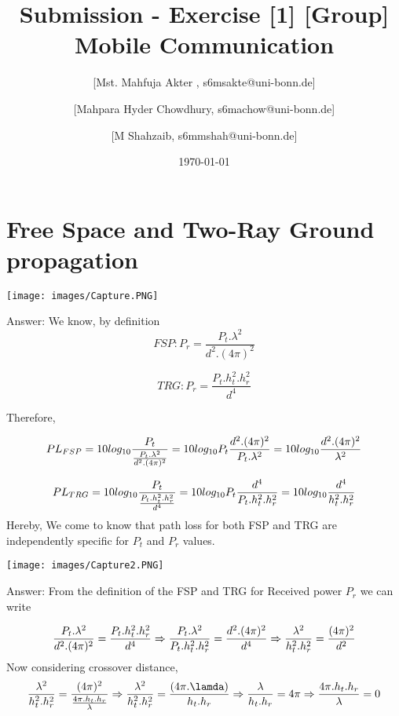 \documentclass[10pt,a4paper]{article}
\begin{document}
\title{Submission - Exercise [1] [Group]\\
\large{Mobile Communication}}
\author{ [Mst. Mahfuja Akter , s6msakte@uni-bonn.de] \and [Mahpara Hyder Chowdhury, s6machow@uni-bonn.de]
\and [M Shahzaib, s6mmshah@uni-bonn.de]}
\date{\today}
\maketitle

\section{Free Space and Two-Ray Ground propagation}
\begin{center}
\texttt{[image: images/Capture.PNG]}
\end{center}
Answer: We know, by definition
\[ FSP : P_r = \frac{P_t.\lambda^2}{d^2.(4\pi)^2} \]

\[ TRG : P_r = \frac{P_t.h_t^2.h_r^2}{d^4} \]

Therefore,

\[PL_{FSP} = 10log_{10}\frac{P_t}{\frac{P_t.\lambda^2}{d^2.(4\pi)^2}}\newline
= 10log_{10}P_t\frac{d^2.(4\pi)^2}{P_t.\lambda^2}\newline
= 10log_{10}\frac{d^2.(4\pi)^2}{\lambda^2}
\]

\[PL_{TRG}  =  10log_{10}\frac{P_t}{\frac{P_t.h_t^2.h_r^2}{d^4}}\newline
= 10log_{10}P_t\frac{d^4}{P_t.h_t^2.h_r^2}\newline
= 10log_{10}\frac{d^4}{h_t^2.h_r^2}
\]
Hereby, We come to know that path loss for both FSP and TRG are independently specific for $P_t$ and $P_r$ values.
\begin{center}
\texttt{[image: images/Capture2.PNG]}
\end{center}

Answer: From the definition of the FSP and TRG for Received power $P_r$ we can write

\[
\frac{P_t.\lambda^2}{d^2.(4\pi)^2} = \frac{P_t.h_t^2.h_r^2}{d^4} \newline
\Rightarrow \frac{P_t.\lambda^2}{P_t.h_t^2.h_r^2} = \frac{d^2.(4\pi)^2}{d^4}\newline
\Rightarrow \frac{\lambda^2}{h_t^2.h_r^2} = \frac{(4\pi)^2}{d^2}\]
\newline
Now considering crossover distance,
\[
\frac{\lambda^2}{h_t^2.h_r^2} = \frac{(4\pi)^2}{\frac{4\pi.h_t.h_r}{\lambda}}
\Rightarrow \frac{\lambda^2}{h_t^2.h_r^2} = \frac{(4\pi.\lamda)}{h_t.h_r}
\Rightarrow \frac{\lambda}{h_t.h_r} = 4\pi
\Rightarrow \frac{4\pi.h_t.h_r}{\lambda} = 0


\]
\end{document}
